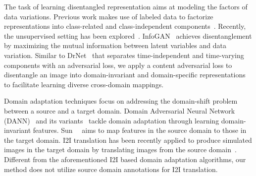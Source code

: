 \documentclass[runningheads]{llncs}
\renewcommand{\jiabin}[1]{}
\begin{document}
%
The task of learning disentangled representation aims at modeling the factors of data variations.
Previous work makes use of labeled data to factorize representations into class-related and class-independent components~\cite{cheung2014discovering,kingma2014semi,makhzani2015adversarial,mathieu2016disentangling}.
%
Recently, the unsupervised setting has been explored~\cite{chen2016infogan,denton2017unsupervised}.
%
InfoGAN~\cite{chen2016infogan} achieves disentanglement by maximizing the mutual information between latent variables and data variation.
%
Similar to DrNet~\cite{denton2017unsupervised} that separates time-independent and time-varying components with an adversarial loss, we apply a content adversarial loss to disentangle an image into domain-invariant and domain-specific representations to facilitate learning diverse cross-domain mappings. 

\vspace{\paramargin}
Domain adaptation techniques focus on addressing the domain-shift problem between a source and a target domain.
%
Domain Adversarial Neural Network (DANN)~\cite{ganin2015unsupervised,ganin2016domain} and its variants~\cite{tzeng2014deep,bousmalis2016domain,Tsai_adaptseg_2018} tackle domain adaptation through learning domain-invariant features.
%
Sun~\etal~\cite{sun2016return} aims to map features in the source domain to those in the target domain. 
%
I2I translation has been recently applied to produce simulated images in the target domain by translating images from the source domain~\cite{ganin2015unsupervised,hoffman2017cycada}.
%
Different from the aforementioned I2I based domain adaptation algorithms, our method does not utilize source domain annotations for I2I translation. 
%
\end{document}
